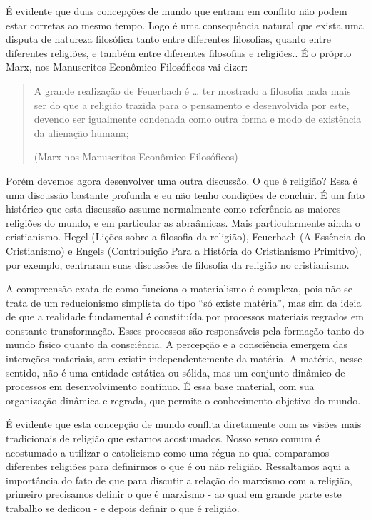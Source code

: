 É evidente que duas concepções de mundo que entram em conflito não podem estar corretas ao mesmo tempo. Logo é uma consequência natural que exista uma disputa de natureza filosófica tanto entre diferentes filosofias, quanto entre diferentes religiões, e também entre diferentes filosofias e religiões.. É o próprio Marx, nos Manuscritos Econômico-Filosóficos vai dizer:

\begin{quote}
A grande realização de Feuerbach é … ter mostrado a filosofia nada mais ser do que a religião trazida para o pensamento e desenvolvida por este, devendo ser igualmente condenada como outra forma e modo de existência da alienação humana;

(Marx nos Manuscritos Econômico-Filosóficos)
\end{quote}

Porém devemos agora desenvolver uma outra discussão. O que é religião? Essa é uma discussão bastante profunda e eu não tenho condições de concluir. É um fato histórico que esta discussão assume normalmente como referência as maiores religiões do mundo, e em particular as abraâmicas. Mais particularmente ainda o cristianismo. Hegel (Lições sobre a filosofia da religião), Feuerbach (A Essência do Cristianismo) e Engels (Contribuição Para a História do Cristianismo Primitivo), por exemplo, centraram suas discussões de filosofia da religião no cristianismo.

A compreensão exata de como funciona o materialismo é complexa, pois não se trata de um reducionismo simplista do tipo “só existe matéria”, mas sim da ideia de que a realidade fundamental é constituída por processos materiais regrados em constante transformação. Esses processos são responsáveis pela formação tanto do mundo físico quanto da consciência. A percepção e a consciência emergem das interações materiais, sem existir independentemente da matéria. A matéria, nesse sentido, não é uma entidade estática ou sólida, mas um conjunto dinâmico de processos em desenvolvimento contínuo. É essa base material, com sua organização dinâmica e regrada, que permite o conhecimento objetivo do mundo.

É evidente que esta concepção de mundo conflita diretamente com as visões mais tradicionais de religião que estamos acostumados. Nosso senso comum é acostumado a utilizar o catolicismo como uma régua no qual comparamos diferentes religiões para definirmos o que é ou não religião. Ressaltamos aqui a importância do fato de que para discutir a relação do marxismo com a religião, primeiro precisamos definir o que é marxismo - ao qual em grande parte este trabalho se dedicou - e depois definir o que é religião.

